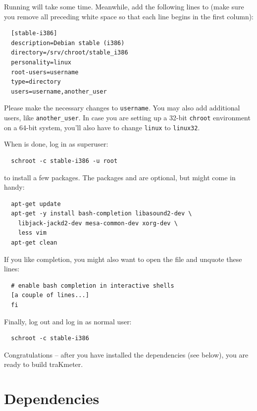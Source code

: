Running  will take some time.  Meanwhile, add the
following lines to  (make sure you
remove all preceding white space so that each line begins in the first
column):

\begin{verbatim}
  [stable-i386]
  description=Debian stable (i386)
  directory=/srv/chroot/stable_i386
  personality=linux
  root-users=username
  type=directory
  users=username,another_user
\end{verbatim}

Please make the necessary changes to \texttt{username}.  You may also
add additional users, like \texttt{another\_user}.  In case you are
setting up a \num{32}-bit \texttt{chroot} environment on a
\num{64}-bit system, you'll also have to change \texttt{linux} to
\texttt{linux32}.

When  is done, log in as superuser:

\begin{verbatim}
  schroot -c stable-i386 -u root
\end{verbatim}

to install a few packages.  The packages  and 
are optional, but might come in handy:

\begin{verbatim}
  apt-get update
  apt-get -y install bash-completion libasound2-dev \
    libjack-jackd2-dev mesa-common-dev xorg-dev \
    less vim
  apt-get clean
\end{verbatim}

If you like  completion, you might also want to open the
file  and unquote these lines:

\begin{verbatim}
  # enable bash completion in interactive shells
  [a couple of lines...]
  fi
\end{verbatim}

Finally, log out and log in as normal user:

\begin{verbatim}
  schroot -c stable-i386
\end{verbatim}

Congratulations -- after you have installed the dependencies (see
below), you are ready to build traKmeter.

\section{Dependencies}

